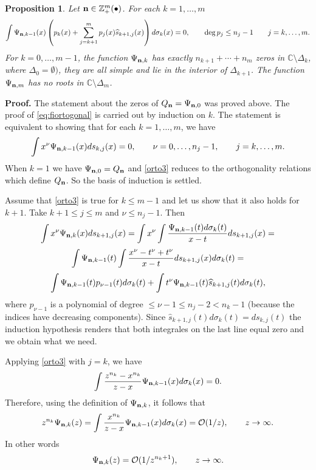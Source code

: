 \documentclass{amsart}
\newtheorem{pro}{\sc Proposition}[section]
\theoremstyle{definition}
\theoremstyle{remark}
\begin{document}
\begin{pro} \label{teo:6} Let ${\bf n} \in \mathbb{Z}_+^m(\bullet)$. For each $k=1,\ldots,m$
\begin{equation}               \label{eq:fiortogonal}
\int \Psi_{{\bf n},k-1}(x)\left(p_k(x) + \sum_{j=k+1}^m p_j(x) \widehat{s}_{k+1,j}(x)\right) d \sigma_k(x)  =0,\qquad
\deg p_j \leq n_j-1 \qquad j=k,\ldots,m.
\end{equation}
For $k=0,\ldots,m-1$, the function $\Psi_{{\bf n},k}$ has exactly $n_{k+1}+\cdots+n_m$ zeros in
$\mathbb{C} \setminus \Delta_{ k}$, where $\Delta_0 =\emptyset)$, they are all simple and lie in the interior of $\Delta_{k+1}$. The function $\Psi_{{\bf n},m}$ has no roots in $\mathbb{C} \setminus \Delta_{ m}$.
\end{pro}

{\bf Proof.}  The statement about the zeros of $ Q_{\bf n} = \Psi_{{\bf n},0}$ was proved above. The proof of \eqref{eq:fiortogonal} is carried out by induction on $k$. The statement is equivalent to showing that for each $k=1,\ldots,m$, we have
\begin{equation} \label{orto3} \int x^\nu \Psi_{{\bf n},k-1}(x)  d s_{k,j}(x)  =0,\qquad  \nu=0,\ldots,n_j -1, \qquad j=k,\ldots,m.
\end{equation}
When $k=1$ we have $\Psi_{{\bf n},0} = Q_{\bf n}$ and \eqref{orto3} reduces to the orthogonality relations which define $Q_{\bf n}$.
So the basis of induction is settled.

Assume that \eqref{orto3} is true for $k \leq m-1$ and let us show that it also holds for $k+1$. Take $k+1\leq j \leq m$ and $\nu \leq n_j -1$. Then
\[ \int x^\nu \Psi_{{\bf n},k}(x)  d s_{k+1,j}(x)  = \int x^\nu \int \frac{\Psi_{{\bf n},k-1}(t)d\sigma_k(t)}{x-t}  d s_{k+1,j}(x) = \]
\[ \int \Psi_{{\bf n},k-1}(t)\int \frac{ x^\nu - t^\nu + t^\nu}{x-t}  d s_{k+1,j}(x) d\sigma_k(t) =\]
\[  \int \Psi_{{\bf n},k-1}(t) p_{\nu -1}(t)  d\sigma_k(t)  + \int t^\nu \Psi_{{\bf n},k-1}(t) \widehat{s}_{k+1,j}(t) d\sigma_k(t),
\]
where $p_{\nu-1}$ is a polynomial of degree $\leq \nu-1 \leq n_j-2 < n_k -1$ (because the indices have decreasing components).
Since $\widehat{s}_{k+1,j}(t) d\sigma_k(t) = d s_{k,j}(t)$ the induction hypothesis renders that both integrales on the last line equal zero and we obtain what we need.

Applying \eqref{orto3} with $j=k$, we have
\[ \int \frac{z^{n_k} - x^{n_k}}{z-x}  \Psi_{{\bf n},k-1}(x) d\sigma_k(x) = 0.\]
Therefore, using the definition of $\Psi_{{\bf n},k}$, it follows that
\[ z^{n_k}  \Psi_{{\bf n},k}(z) = \int \frac{x^{n_k}}{z-x}  \Psi_{{\bf n},k-1}(x) d\sigma_k(x) = \mathcal{O}(1/z), \qquad z \to \infty.
\]
In other words
\[ \Psi_{{\bf n},k}(z) = \mathcal{O}(1/z^{n_k+1}), \qquad z \to \infty.
\]
\end{document}
